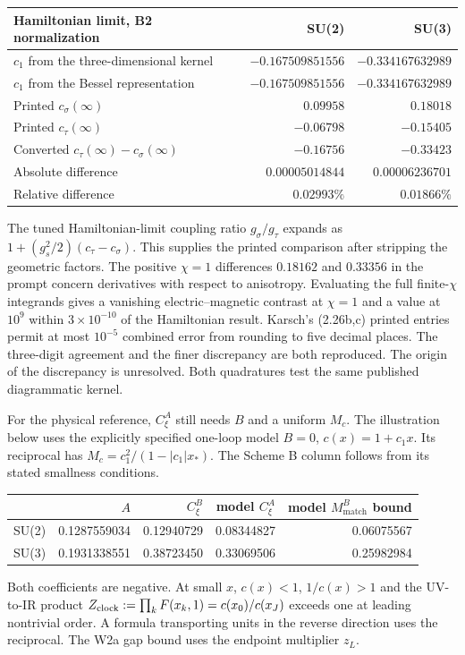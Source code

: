 \documentclass[11pt,a4paper]{article}
\newcommand{\Section}[1]{\par\addvspace{6pt}{\sffamily\bfseries\color{teal}\large #1\par}\nobreak\vspace{1pt}}
\newcommand{\lab}[1]{{\sffamily\bfseries\color{teal}#1}}
\newcommand{\match}{\mathrm{match}}
\begin{document}
\begin{center}
\begin{tabular}{@{}lrr@{}}\toprule
\lab{Hamiltonian limit, B2 normalization} & \lab{SU(2)} & \lab{SU(3)}\\\midrule
$c_1$ from the three-dimensional kernel & $-0.167509851556$ & $-0.334167632989$\\
$c_1$ from the Bessel representation & $-0.167509851556$ & $-0.334167632989$\\
Printed $c_\sigma(\infty)$ & $0.09958$ & $0.18018$\\
Printed $c_\tau(\infty)$ & $-0.06798$ & $-0.15405$\\
Converted $c_\tau(\infty)-c_\sigma(\infty)$ & $-0.16756$ & $-0.33423$\\
Absolute difference & $0.00005014844$ & $0.00006236701$\\
Relative difference & $0.02993\%$ & $0.01866\%$\\\bottomrule
\end{tabular}
\end{center}
The tuned Hamiltonian-limit coupling ratio $g_\sigma/g_\tau$ expands as $1+(g_s^2/2)(c_\tau-c_\sigma)$. This supplies the printed comparison after stripping the geometric factors. The positive $\chi=1$ differences $0.18162$ and $0.33356$ in the prompt concern derivatives with respect to anisotropy. Evaluating the full finite-$\chi$ integrands gives a vanishing electric--magnetic contrast at $\chi=1$ and a value at $10^9$ within $3\times10^{-10}$ of the Hamiltonian result. Karsch's (2.26b,c) printed entries permit at most $10^{-5}$ combined error from rounding to five decimal places. The three-digit agreement and the finer discrepancy are both reproduced. The origin of the discrepancy is unresolved. Both quadratures test the same published diagrammatic kernel.

\Section{The numerical constants at $g_*^2=1/6$}
For the physical reference, $C_\xi^A$ still needs $B$ and a uniform $M_c$. The illustration below uses the explicitly specified one-loop model $B=0$, $c(x)=1+c_1x$. Its reciprocal has $M_c=c_1^2/(1-|c_1|x_*)$. The Scheme B column follows from its stated smallness conditions.\par
\begin{center}
\begin{tabular}{@{}lrrrr@{}}\toprule
& $A$ & $C_\xi^B$ & model $C_\xi^A$ & model $M_{\match}^B$ bound\\\midrule
SU(2)&0.1287559034&0.12940729&0.08344827&0.06075567\\
SU(3)&0.1931338551&0.38723450&0.33069506&0.25982984\\\bottomrule
\end{tabular}\end{center}
Both coefficients are negative. At small $x$, $c(x)<1$, $1/c(x)>1$ and the UV-to-IR product $Z_{\rm clock}:=\prod_k F(x_k,1)=c(x_0)/c(x_J)$ exceeds one at leading nontrivial order. A formula transporting units in the reverse direction uses the reciprocal. The W2a gap bound uses the endpoint multiplier $z_L$.
\end{document}
